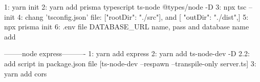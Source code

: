 1: yarn init
2: yarn add prisma typescript ts-node @types/node -D
3: npx tsc --init
4: chang 'tsconfig.json' file: ["rootDir": "./src"],   and [ "outDir": "./dist",]
5: npx prisma init
6: .env file DATABASE_URL name, pass and database name add



--------node express----------
1: yarn add express
2: yarn add ts-node-dev -D
2.2: add script in package.json file [ts-node-dev --respawn --transpile-only server.ts]
3: yarn add cors